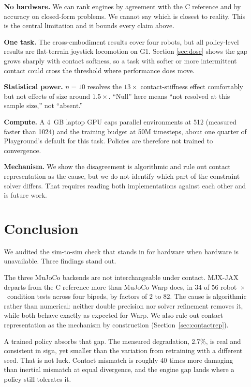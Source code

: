 \documentclass[conference]{IEEEtran}
\begin{document}
\textbf{No hardware.} We can rank engines by agreement with the C
reference and by accuracy on closed-form problems. We cannot say which is
closest to reality. This is the central limitation and it bounds every
claim above.

\textbf{One task.} The cross-embodiment results cover four robots, but all
policy-level results are flat-terrain joystick locomotion on G1. Section
\ref{sec:dose} shows the gap grows sharply with contact softness, so a
task with softer or more intermittent contact could cross the threshold
where performance does move.

\textbf{Statistical power.} $n=10$ resolves the $13\times$
contact-stiffness effect comfortably but not effects of size around
$1.5\times$. ``Null'' here means ``not resolved at this sample size,'' not
``absent.''

\textbf{Compute.} A 4~GB laptop GPU caps parallel environments at 512
(measured faster than 1024) and the training budget at 50M timesteps,
about one quarter of Playground's default for this task. Policies are
therefore not trained to convergence.

\textbf{Mechanism.} We show the disagreement is algorithmic and rule out
contact representation as the cause, but we do not identify which part of
the constraint solver differs. That requires reading both implementations
against each other and is future work.

\section{Conclusion}

We audited the sim-to-sim check that stands in for hardware when hardware
is unavailable. Three findings stand out.

The three MuJoCo backends are not interchangeable under contact. MJX-JAX
departs from the C reference more than MuJoCo Warp does, in 34 of 56
robot~$\times$~condition tests across four bipeds, by factors of 2 to 82.
The cause is algorithmic rather than numerical: neither double precision
nor solver refinement removes it, while both behave exactly as expected
for Warp. We also rule out contact representation as the mechanism by
construction (Section~\ref{sec:contactrep}).

A trained policy absorbs that gap. The measured degradation, 2.7\%, is
real and consistent in sign, yet smaller than the variation from
retraining with a different seed. That is not luck. Contact mismatch is
roughly 40 times more damaging than inertial mismatch at equal divergence,
and the engine gap lands where a policy still tolerates it.
\end{document}
